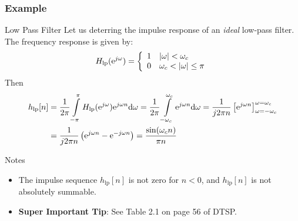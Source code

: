 \documentclass[mathserif,9pt,handout]{beamer}
\def\d{\mathrm{d}}
\begin{document}
\begin{frame}\frametitle{Example}\small
   
   \begin{exampleblock}{Low Pass Filter}
   Let us deterring the impulse response of an {\em ideal} low-pass filter. The frequency response is given by: 
   \begin{align}
     H_{\textrm{lp}}({\textrm{e}}^{j\omega}) = \left\{
       \begin{array}{l l}
         1 & |\omega| < \omega_c \\
         0 & \omega_c < |\omega| \leq \pi
       \end{array}
     \right.
     \nonumber
   \end{align}
   Then 
   \begin{align}
     h_{\textrm{lp}}[n] &= \frac{1}{2\pi} \int\limits_{-\pi}^{\pi} H_{\textrm{lp}}(\e^{j\omega}) \e^{j\omega n} \d\omega
     = \frac{1}{2\pi} \int\limits_{-\omega_c}^{\omega_c} \e^{j\omega n} \d\omega = \frac{1}{j 2\pi n} \left[ \e^{j\omega n} \right]_{\omega=-\omega_c}^{\omega=\omega_c}
     \nonumber \\
     &= \frac{1}{j 2\pi n} \left( \e^{j\omega n} - \e^{-j\omega n} \right) = \frac{\sin(\omega_c n)}{\pi n}
     \nonumber
   \end{align}
   \end{exampleblock}
   
   \begin{alertblock}{Notes}
   \begin{itemize}
     \item The impulse sequence $h_{\textrm{lp}}[n]$ is not zero for $n < 0$, and $h_{\textrm{lp}}[n]$ is not absolutely summable. 
     \item {\bf\color{red}Super Important Tip}: See Table 2.1 on page 56 of DTSP. 
   \end{itemize}
   \end{alertblock}
   
\end{frame}
\end{document}
